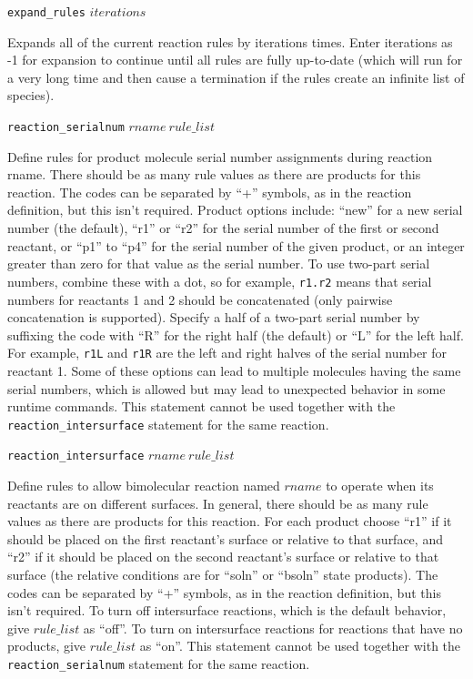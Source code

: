 \documentclass {scrbook}
\newcommand {\ttt} {\texttt}
\begin{document}
\begin{description}
\item{\ttt{expand\_rules} $iterations$}

Expands all of the current reaction rules by iterations times. Enter iterations as -1 for expansion to continue until all rules are fully up-to-date (which will run for a very long time and then cause a termination if the rules create an infinite list of species).

\item{\ttt{reaction\_serialnum} $rname\ rule\_list$}

Define rules for product molecule serial number assignments during reaction rname. There should be as many rule values as there are products for this reaction. The codes can be separated by ``+'' symbols, as in the reaction definition, but this isn't required. Product options include: ``new'' for a new serial number (the default), ``r1'' or ``r2'' for the serial number of the first or second reactant, or ``p1'' to ``p4'' for the serial number of the given product, or an integer greater than zero for that value as the serial number. To use two-part serial numbers, combine these with a dot, so for example, \ttt{r1.r2} means that serial numbers for reactants 1 and 2 should be concatenated (only pairwise concatenation is supported). Specify a half of a two-part serial number by suffixing the code with ``R'' for the right half (the default) or ``L'' for the left half. For example, \ttt{r1L} and \ttt{r1R} are the left and right halves of the serial number for reactant 1. Some of these options can lead to multiple molecules having the same serial numbers, which is allowed but may lead to unexpected behavior in some runtime commands. This statement cannot be used together with the \ttt{reaction\_intersurface} statement for the same reaction.

\item{\ttt{reaction\_intersurface} $rname\ rule\_list$}

Define rules to allow bimolecular reaction named $rname$ to operate when its reactants are on different surfaces. In general, there should be as many rule values as there are products for this reaction. For each product choose ``r1'' if it should be placed on the first reactant's surface or relative to that surface, and ``r2'' if it should be placed on the second reactant's surface or relative to that surface (the relative conditions are for ``soln'' or ``bsoln'' state products). The codes can be separated by ``+'' symbols, as in the reaction definition, but this isn't required. To turn off intersurface reactions, which is the default behavior, give $rule\_list$ as ``off''. To turn on intersurface reactions for reactions that have no products, give $rule\_list$ as ``on''. This statement cannot be used together with the \ttt{reaction\_serialnum} statement for the same reaction.


\end{description}
\end{document}
